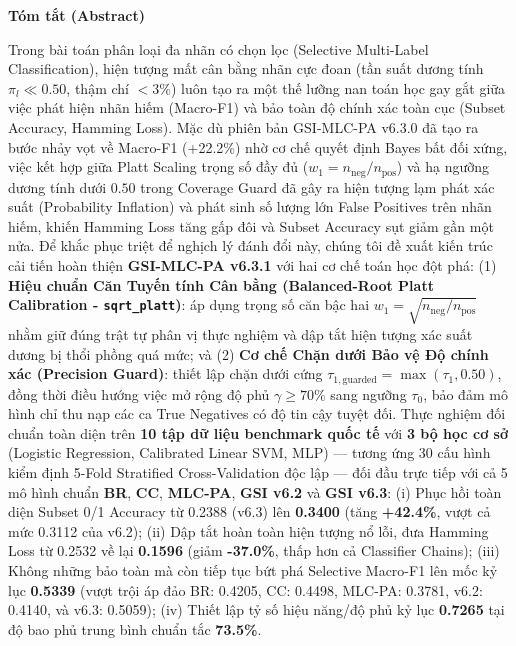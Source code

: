 \documentclass[10pt,a4paper,twoside]{article}
\begin{document}
\begin{center}\textbf{Tóm tắt (Abstract)}\end{center}
Trong bài toán phân loại đa nhãn có chọn lọc (Selective Multi-Label Classification), hiện tượng mất cân bằng nhãn cực đoan (tần suất dương tính $\pi_l \ll 0.50$, thậm chí $< 3\%$) luôn tạo ra một thế lưỡng nan toán học gay gắt giữa việc phát hiện nhãn hiếm (Macro-F1) và bảo toàn độ chính xác toàn cục (Subset Accuracy, Hamming Loss). Mặc dù phiên bản GSI-MLC-PA v6.3.0 đã tạo ra bước nhảy vọt về Macro-F1 (+22.2\%) nhờ cơ chế quyết định Bayes bất đối xứng, việc kết hợp giữa Platt Scaling trọng số đầy đủ ($w_1 = n_{\text{neg}}/n_{\text{pos}}$) và hạ ngưỡng dương tính dưới $0.50$ trong Coverage Guard đã gây ra hiện tượng lạm phát xác suất (Probability Inflation) và phát sinh số lượng lớn False Positives trên nhãn hiếm, khiến Hamming Loss tăng gấp đôi và Subset Accuracy sụt giảm gần một nửa. Để khắc phục triệt để nghịch lý đánh đổi này, chúng tôi đề xuất kiến trúc cải tiến hoàn thiện \textbf{GSI-MLC-PA v6.3.1} với hai cơ chế toán học đột phá: (1) \textbf{Hiệu chuẩn Căn Tuyến tính Cân bằng (Balanced-Root Platt Calibration - \texttt{sqrt\_platt})}: áp dụng trọng số căn bậc hai $w_1 = \sqrt{n_{\text{neg}}/n_{\text{pos}}}$ nhằm giữ đúng trật tự phân vị thực nghiệm và dập tắt hiện tượng xác suất dương bị thổi phồng quá mức; và (2) \textbf{Cơ chế Chặn dưới Bảo vệ Độ chính xác (Precision Guard)}: thiết lập chặn dưới cứng $\tau_{1, \text{guarded}} = \max(\tau_1, 0.50)$, đồng thời điều hướng việc mở rộng độ phủ $\gamma \ge 70\%$ sang ngưỡng $\tau_0$, bảo đảm mô hình chỉ thu nạp các ca True Negatives có độ tin cậy tuyệt đối. Thực nghiệm đối chuẩn toàn diện trên \textbf{10 tập dữ liệu benchmark quốc tế} với \textbf{3 bộ học cơ sở} (Logistic Regression, Calibrated Linear SVM, MLP) --- tương ứng 30 cấu hình kiểm định 5-Fold Stratified Cross-Validation độc lập --- đối đầu trực tiếp với cả 5 mô hình chuẩn \textbf{BR}, \textbf{CC}, \textbf{MLC-PA}, \textbf{GSI v6.2} và \textbf{GSI v6.3}: (i) Phục hồi toàn diện Subset 0/1 Accuracy từ 0.2388 (v6.3) lên \textbf{0.3400} (tăng \textbf{+42.4\%}, vượt cả mức 0.3112 của v6.2); (ii) Dập tắt hoàn toàn hiện tượng nổ lỗi, đưa Hamming Loss từ 0.2532 về lại \textbf{0.1596} (giảm \textbf{-37.0\%}, thấp hơn cả Classifier Chains); (iii) Không những bảo toàn mà còn tiếp tục bứt phá Selective Macro-F1 lên mốc kỷ lục \textbf{0.5339} (vượt trội áp đảo BR: 0.4205, CC: 0.4498, MLC-PA: 0.3781, v6.2: 0.4140, và v6.3: 0.5059); (iv) Thiết lập tỷ số hiệu năng/độ phủ kỷ lục \textbf{0.7265} tại độ bao phủ trung bình chuẩn tắc \textbf{73.5\%}.
\end{document}
